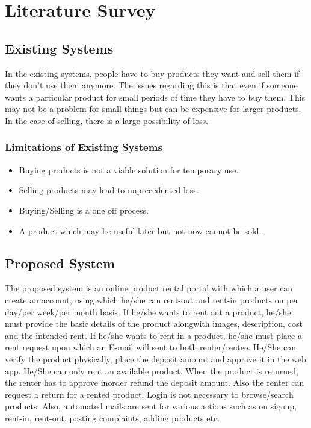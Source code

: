 \documentclass[11pt]{report}
\begin{document}
 
 

\chapter {Literature Survey}
\label{ls}
 
\section{ Existing Systems}
In the existing systems, people have to buy products they want and sell them if they don't use them anymore. The issues regarding this is that even if someone wants a particular product for small periods of time they have to buy them. This may not be a problem for small things but can be expensive for larger products. In the case of selling, there is a large possibility of loss.
\subsection{Limitations of Existing Systems}
\begin{itemize}
  \item Buying products is not a viable solution for temporary use.
  \item Selling products may lead to unprecedented loss.
  \item Buying/Selling is a one off process.
  \item A product which may be useful later but not now cannot be sold.
\end{itemize}


\section{Proposed System}
 The proposed system is an online product rental portal with which a user can create an account, using which he/she can rent-out and rent-in products on per day/per week/per month basis. If he/she wants to rent out a product, he/she must provide the basic details of the product alongwith images, description, cost and the intended rent. If he/she wants to rent-in a product, he/she must place a rent request upon which an E-mail will sent to both renter/rentee. He/She can verify the product physically, place the deposit amount and approve it in the web app. He/She can only rent an available product. When the product is returned, the renter has to approve inorder refund the deposit amount. Also the renter can request a return for a rented product. Login is not necessary to browse/search products. Also, automated mails are sent for various actions such as on signup, rent-in, rent-out, posting complaints, adding products etc.
\end{document}
